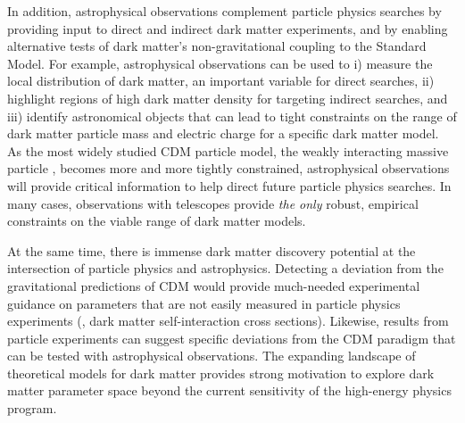 In addition, astrophysical observations complement particle physics searches by providing input to direct and indirect dark matter experiments, and by enabling alternative tests of dark matter's non-gravitational coupling to the Standard Model.  
For example, astrophysical observations can be used to i) measure the local distribution of dark matter, an important variable for direct searches, ii) highlight regions of high dark matter density for targeting indirect searches, and iii) identify astronomical objects that can lead to tight constraints on the range of dark matter particle mass and electric charge for a specific dark matter model.  
As the most widely studied CDM particle model, the weakly interacting massive particle \citep[WIMP;][]{steigman1985}, becomes more and more tightly constrained, astrophysical observations will provide critical information to help direct future particle physics searches.  
In many cases, observations with telescopes provide \emph{the only} robust, empirical constraints on the viable range of dark matter models.

At the same time, there is immense dark matter discovery potential at the intersection of particle physics and astrophysics.
Detecting a deviation from the gravitational predictions of CDM would provide much-needed experimental guidance on parameters that are not easily measured in particle physics experiments (\eg, dark matter self-interaction cross sections). 
Likewise, results from particle experiments can suggest specific deviations from the CDM paradigm that can be tested with astrophysical observations.
The expanding landscape of theoretical models for dark matter provides strong motivation to explore dark matter parameter space beyond the current sensitivity of the high-energy physics program.

